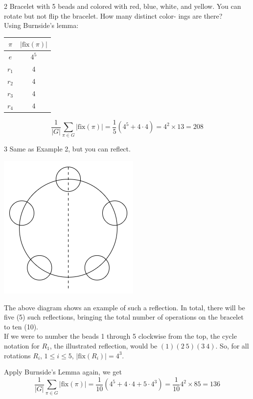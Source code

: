 \begin{example}2
    Bracelet with 5 beads and colored with red, blue, white, and
yellow. You can rotate but not ﬂip the bracelet. How many distinct color-
ings are there?\\

Using Burnside's lemma:
\begin{center}
    \begin{tabular}{c|c}
        $\pi$ & $|\mathrm{fix}(\pi)|$ \\ \hline 
        $e$ & $4^5$ \\ 
        $r_1$ & 4 \\ 
        $r_2$ & 4 \\ 
        $r_3$ & 4 \\ 
        $r_4$ & 4 \\ 
    \end{tabular}
\end{center}
\[
    \frac 1{|G|}\sum_{\pi \in G}|\mathrm{fix}(\pi)| = 
    \frac 15 (4^5 + 4 \cdot 4) = 4^2 \times 13 = \boxed{208}
\]
\end{example}

\begin{example}3
    Same as Example 2, but you can reflect. 
    \begin{center}
        \includegraphics[scale=1]{figures/bracelet.png}
    \end{center}
    The above diagram shows an example of such a reflection. In total, there
    will be five (5) such reflections, bringing the total number of operations on
    the bracelet to ten (10).\\
      
    If we were to number the beads 1 through 5 clockwise from the top, the
    cycle notation for $R_1$, the illustrated reflection, would be $(1)(2 \ 5)(3 \ 4)$. 
    So, for all rotations $R_i$, $1 \leq i \leq 5$, $|\mathrm{fix}(R_i)| = 4^3$. 

    Apply Burnside's Lemma again, we get 
    \[
        \frac 1{|G|}\sum_{\pi \in G}|\mathrm{fix}(\pi)| = 
    \frac 1{10} (4^5 + 4 \cdot 4 + 5 \cdot 4^3) = 
    \frac 1{10} 4^2 \times 85 = \boxed{136}
    \]
 
\end{example}

